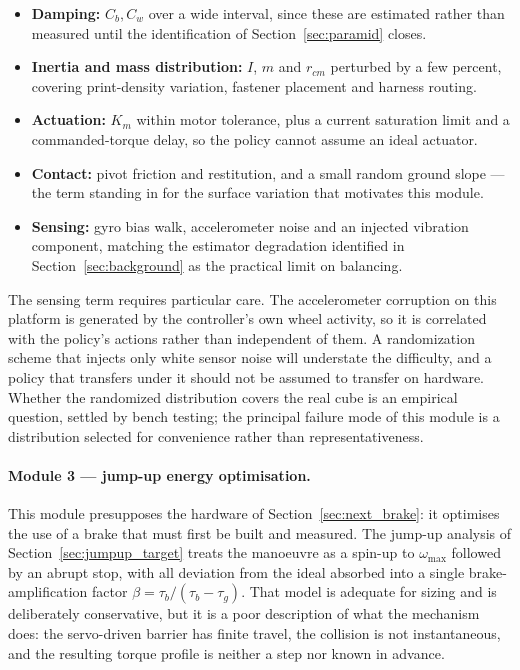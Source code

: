 \begin{itemize}
    \item \textbf{Damping:} $C_b, C_w$ over a wide interval, since these are
    estimated rather than measured until the identification of
    Section~\ref{sec:paramid} closes.
    \item \textbf{Inertia and mass distribution:} $I$, $m$ and $r_{cm}$
    perturbed by a few percent, covering print-density variation, fastener
    placement and harness routing.
    \item \textbf{Actuation:} $K_m$ within motor tolerance, plus a current
    saturation limit and a commanded-torque delay, so the policy cannot assume
    an ideal actuator.
    \item \textbf{Contact:} pivot friction and restitution, and a small random
    ground slope --- the term standing in for the surface variation that
    motivates this module.
    \item \textbf{Sensing:} gyro bias walk, accelerometer noise and an
    injected vibration component, matching the estimator degradation
    identified in Section~\ref{sec:background} as the practical limit on
    balancing.
\end{itemize}

The sensing term requires particular care. The accelerometer corruption on this
platform is generated by the controller's own wheel activity, so it is
correlated with the policy's actions rather than independent of them. A
randomization scheme that injects only white sensor noise will understate the
difficulty, and a policy that transfers under it should not be assumed to
transfer on hardware. Whether the randomized distribution covers the real cube
is an empirical question, settled by bench testing; the principal failure mode
of this module is a distribution selected for convenience rather than
representativeness.

\paragraph{Module 3 --- jump-up energy optimisation.} This module presupposes the
hardware of Section~\ref{sec:next_brake}: it optimises the use of a brake that
must first be built and measured. The jump-up analysis of Section~\ref{sec:jumpup_target} treats the manoeuvre as
a spin-up to $\omega_{\max}$ followed by an abrupt stop, with all deviation
from the ideal absorbed into a single brake-amplification factor
$\beta = \tau_b/(\tau_b-\tau_g)$. That model is adequate for sizing and is
deliberately conservative, but it is a poor description of what the mechanism
does: the servo-driven barrier has finite travel, the collision is not
instantaneous, and the resulting torque profile is neither a step nor known in
advance.

